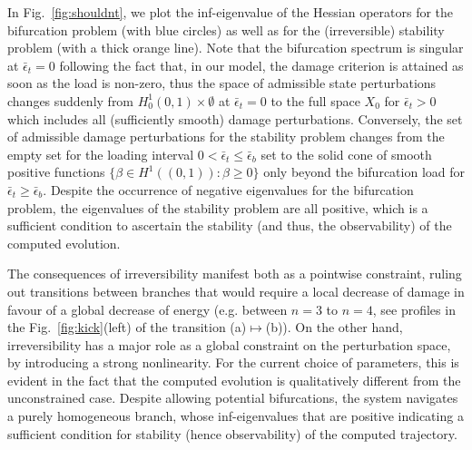 \documentclass[10pt]{article}
\begin{document}
%

In Fig.~\ref{fig:shouldnt}, we plot the inf-eigenvalue of the Hessian operators for the bifurcation problem (with blue circles) as well as for the (irreversible) stability problem (with a thick orange line). 
Note that the bifurcation spectrum is singular at $\bar \epsilon_t=0$ following the fact that, in our model, the damage criterion is attained as soon as the load is non-zero, thus the space of admissible state perturbations changes suddenly from $H^1_0(0,1) \times \emptyset$ at $\bar \epsilon_t=0$ to the full space $X_0$ for $\bar \epsilon_t>0$ which includes all (sufficiently smooth) damage perturbations. 
Conversely, the set of admissible damage perturbations for the stability problem changes from the empty set for the loading interval $0 < \bar\epsilon_t\leq \bar\epsilon_b$ set to the solid cone of smooth positive functions $\{\beta\in H^1((0,1)):\beta \geq 0\}$ only beyond the bifurcation load for $\bar\epsilon_t \geq \bar\epsilon_b$.
Despite the occurrence of negative eigenvalues for the bifurcation problem, the eigenvalues of the stability problem are all positive, which is a sufficient condition to ascertain the stability (and thus, the observability) of the computed evolution.

The consequences of irreversibility manifest both as a pointwise constraint, ruling out transitions between branches that would require a local decrease of damage in favour of a global decrease of energy (e.g. between $n=3$ to $n=4$, see profiles in the Fig.~\ref{fig:kick}(left) of the transition (a)$\mapsto$(b)). 
On the other hand, irreversibility has a major role  as a global constraint on the perturbation space, by introducing a strong nonlinearity. For the current choice of parameters, this is evident in the fact that the computed evolution is qualitatively different from the unconstrained case. Despite allowing potential bifurcations, the system navigates a purely homogeneous branch, whose inf-eigenvalues that are positive indicating a sufficient condition for stability (hence observability) of the computed trajectory.
\end{document}
